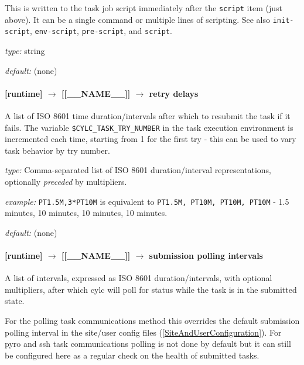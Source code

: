 This is written to the task job script immediately after the \lstinline=script=
item (just above).  It can be a single command or multiple lines of scripting.  See also
\lstinline=init-script=, \lstinline=env-script=, \lstinline=pre-script=, and
\lstinline=script=.

\begin{myitemize}
\item {\em type:} string
\item {\em default:} (none)
\end{myitemize}

\paragraph[retry delays]{[runtime] $\rightarrow$ [[\_\_NAME\_\_]] $\rightarrow$ retry delays}
\label{RefRetries}

A list of ISO 8601 time duration/intervals after which to resubmit the task
if it fails. The variable \lstinline=$CYLC_TASK_TRY_NUMBER= in the task
execution environment is incremented each time, starting from 1 for the
first try - this can be used to vary task behavior by try number.

\begin{myitemize}
    \item {\em type:} Comma-separated list of ISO 8601 duration/interval representations,
    optionally {\em preceded} by multipliers.
    \item {\em example:} \lstinline=PT1.5M,3*PT10M= is equivalent to
    \lstinline=PT1.5M, PT10M, PT10M, PT10M= - 1.5 minutes, 10 minutes,
    10 minutes, 10 minutes.
    \item {\em default:} (none)
\end{myitemize}

\paragraph[submission polling intervals]{[runtime] $\rightarrow$ [[\_\_NAME\_\_]] $\rightarrow$ submission polling intervals}
\label{SubmissionPollingIntervals}

A list of intervals, expressed as ISO 8601 duration/intervals, with optional
multipliers, after which cylc will poll for status while the task is in the
submitted state.

For the polling task communications method this overrides the default
submission polling interval in the site/user config files
(\ref{SiteAndUserConfiguration}). For pyro and ssh task communications
polling is not done by default but it can still be configured here as a
regular check on the health of submitted tasks.


